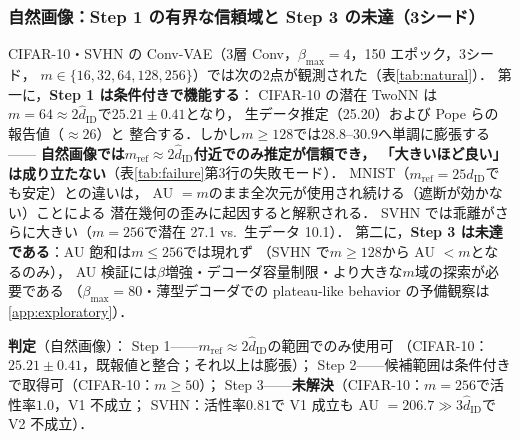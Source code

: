 \documentclass[11pt,a4paper]{jsarticle}
\newcommand{\hatdID}{\hat{d}_{\mathrm{ID}}}
\begin{document}
\subsubsection{自然画像：Step 1 の有界な信頼域と Step 3 の未達（3シード）}

CIFAR-10・SVHN の Conv-VAE（3層 Conv，$\beta_{\max} = 4$，150 エポック，3シード，
$m \in \{16, 32, 64, 128, 256\}$）では次の2点が観測された（表\ref{tab:natural}）．
第一に，\textbf{Step 1 は条件付きで機能する}：
CIFAR-10 の潜在 TwoNN は$m = 64 \approx 2\hatdID$で$25.21 \pm 0.41$となり，
生データ推定（25.20）および Pope ら\cite{pope2021intrinsic}の報告値（$\approx 26$）と
整合する．しかし$m \geq 128$では$28.8$--$30.9$へ単調に膨張する——
\textbf{自然画像では$m_{\mathrm{ref}} \approx 2\hatdID$付近でのみ推定が信頼でき，
「大きいほど良い」は成り立たない}（表\ref{tab:failure}第3行の失敗モード）．
MNIST（$m_{\mathrm{ref}} = 25\hatdID$でも安定）との違いは，
AU $= m$のまま全次元が使用され続ける（遮断が効かない）ことによる
潜在幾何の歪みに起因すると解釈される．
SVHN では乖離がさらに大きい（$m = 256$で潜在 27.1 vs.\ 生データ 10.1）．
第二に，\textbf{Step 3 は未達である}：AU 飽和は$m \leq 256$では現れず
（SVHN で$m \geq 128$から AU $< m$となるのみ），
AU 検証には$\beta$増強・デコーダ容量制限・より大きな$m$域の探索が必要である
（$\beta_{\max} = 80$・薄型デコーダでの plateau-like behavior の予備観察は
\ref{app:exploratory}）．

\textbf{判定}（自然画像）：
Step 1——$m_{\mathrm{ref}} \approx 2\hatdID$の範囲でのみ使用可
（CIFAR-10：$25.21 \pm 0.41$，既報値と整合；それ以上は膨張）；
Step 2——候補範囲は条件付きで取得可（CIFAR-10：$m \geq 50$）；
Step 3——\textbf{未解決}（CIFAR-10：$m = 256$で活性率$1.0$，V1 不成立；
SVHN：活性率$0.81$で V1 成立も AU $= 206.7 \gg 3\hatdID$で V2 不成立）．
\end{document}
